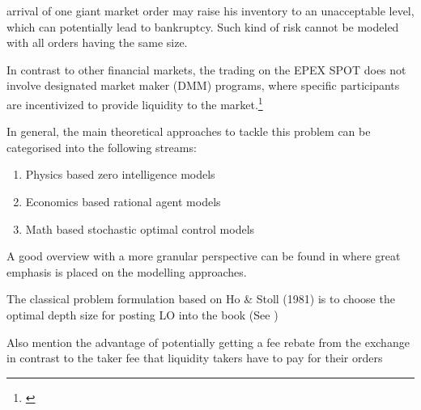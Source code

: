 \documentclass[12pt,a4paper]{cau_thesis}
\begin{document}
arrival of one giant market order may raise his inventory to an
unacceptable level, which can potentially lead to bankruptcy. Such
kind of risk cannot be modeled with all orders having the same size.%
\begin{figure}[htbp]
    \vspace*{0.5cm}
    \centering
    \label{fig:epex_member_category}
\end{figure}
In contrast to other financial markets, the trading on the EPEX SPOT
does not involve designated market maker (DMM) programs, where
specific participants are incentivized to provide liquidity to the
market.\footnote{\cite[See ][, p.230]{balardy2022empirical}}

In general, the main theoretical approaches to tackle this problem
can be categorised into the following streams:
\begin{enumerate}
    \item Physics based zero intelligence models
    \item Economics based rational agent models
    \item Math based stochastic optimal control models
\end{enumerate}

A good overview with a more granular perspective can be found in
\cite{jain2024limitreview} where great emphasis is placed on the
modelling approaches.

The classical problem formulation based on Ho \& Stoll (1981) is to
choose the optimal depth size for posting LO into the book (See
\cite[See ][, p.29]{cartea2015algorithmic})

Also mention the advantage of potentially getting a fee rebate from
the exchange in contrast to the taker fee that liquidity takers have
to pay for their orders
\end{document}
